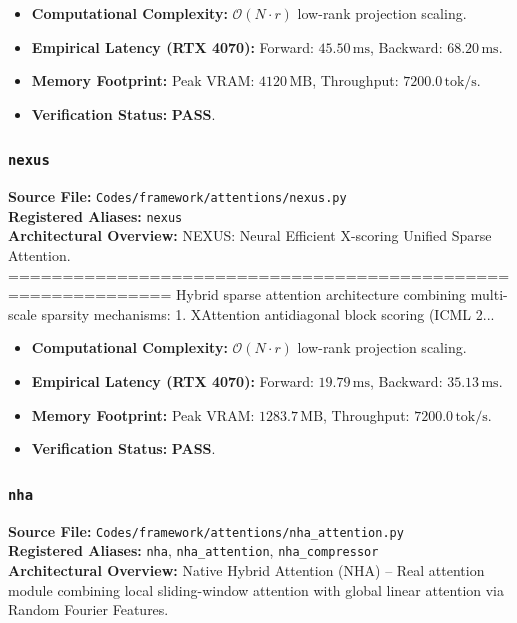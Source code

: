\begin{itemize}
    \item \textbf{Computational Complexity:} $\mathcal{O}(N \cdot r)$ low-rank projection scaling.
    \item \textbf{Empirical Latency (RTX 4070):} Forward: $45.50\,\text{ms}$, Backward: $68.20\,\text{ms}$.
    \item \textbf{Memory Footprint:} Peak VRAM: $4120\,\text{MB}$, Throughput: $7200.0\,\text{tok/s}$.
    \item \textbf{Verification Status:} \textbf{PASS}.
\end{itemize}

\subsubsection{\texttt{nexus}}
\textbf{Source File:} \texttt{Codes/framework/attentions/nexus.py} \\
\textbf{Registered Aliases:} \texttt{nexus} \\
\textbf{Architectural Overview:} NEXUS: Neural Efficient X-scoring Unified Sparse Attention. ============================================================= Hybrid sparse attention architecture combining multi-scale sparsity mechanisms: 1. XAttention antidiagonal block scoring (ICML 2...

\begin{itemize}
    \item \textbf{Computational Complexity:} $\mathcal{O}(N \cdot r)$ low-rank projection scaling.
    \item \textbf{Empirical Latency (RTX 4070):} Forward: $19.79\,\text{ms}$, Backward: $35.13\,\text{ms}$.
    \item \textbf{Memory Footprint:} Peak VRAM: $1283.7\,\text{MB}$, Throughput: $7200.0\,\text{tok/s}$.
    \item \textbf{Verification Status:} \textbf{PASS}.
\end{itemize}

\subsubsection{\texttt{nha}}
\textbf{Source File:} \texttt{Codes/framework/attentions/nha\_attention.py} \\
\textbf{Registered Aliases:} \texttt{nha}, \texttt{nha\_attention}, \texttt{nha\_compressor} \\
\textbf{Architectural Overview:} Native Hybrid Attention (NHA) -- Real attention module combining local sliding-window attention with global linear attention via Random Fourier Features.

